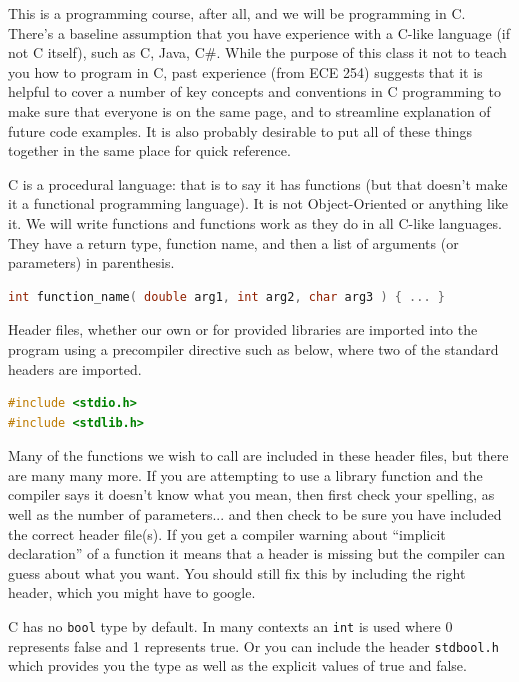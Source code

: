 \documentclass[a4paper]{report}
\newcommand{\Rplus}{\protect\hspace{-.1em}\protect\raisebox{.35ex}{\smaller{\smaller\textbf{+}}}}
\newcommand{\Cpp}{\mbox{C\Rplus\Rplus}\xspace}
\begin{document}
This is a programming course, after all, and we will be programming in C. There's a baseline assumption that you have experience with a C-like language (if not C itself), such as \Cpp, Java, C\#. While the purpose of this class it not to teach you how to program in C, past experience (from ECE 254) suggests that it is helpful to cover a number of key concepts and conventions in C programming to make sure that everyone is on the same page, and to streamline explanation of future code examples. It is also probably desirable to put all of these things together in the same place for quick reference.

C is a procedural language: that is to say it has functions (but that doesn't make it a functional programming language). It is not Object-Oriented or anything like it. We will write functions and functions work as they do in all C-like languages. They have a return type, function name, and then a list of arguments (or parameters) in parenthesis.

\begin{lstlisting}[language=C]
int function_name( double arg1, int arg2, char arg3 ) { ... }
\end{lstlisting}

Header files, whether our own or for provided libraries are imported into the program using a precompiler directive such as below, where two of the standard headers are imported.

\begin{lstlisting}[language=C]
#include <stdio.h>
#include <stdlib.h>
\end{lstlisting}

Many of the functions we wish to call are included in these header files, but there are many many more. If you are attempting to use a library function and the compiler says it doesn't know what you mean, then first check your spelling, as well as the number of parameters... and then check to be sure you have included the correct header file(s). If you get a compiler warning about ``implicit declaration'' of a function it means that a header is missing but the compiler can guess about what you want. You should still fix this by including the right header, which you might have to google.

C has no \texttt{bool} type by default. In many contexts an \texttt{int} is used where 0 represents false and 1 represents true. Or you can include the header \texttt{stdbool.h}  which provides you the type as well as the explicit values of true and false.
\end{document}
